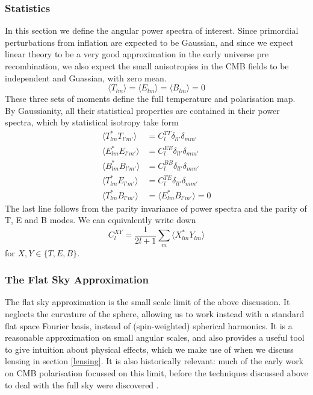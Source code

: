 \documentclass[a4paper,10pt]{article}
\begin{document}
\subsubsection{Statistics}

In this section we define the angular power spectra of interest. Since primordial perturbations from inflation are expected to be Gaussian, and since we expect linear theory to be a very good approximation in the early universe pre recombination, we also expect the small anisotropies in the CMB fields to be independent and Guassian, with zero mean. 
\begin{equation}
\langle T_{lm} \rangle = \langle E_{lm} \rangle = \langle B_{lm} \rangle = 0
\end{equation}
These three sets of moments define the full temperature and polarisation map. By Gaussianity, all their statistical properties are contained in their power spectra, which by statistical isotropy take form
\begin{equation}\begin{split}
\langle T_{lm}^*T_{l'm'} \rangle &= C^{TT}_l\delta_{ll'}\delta_{mm'}\\
\langle E_{lm}^*E_{l'm'} \rangle &= C^{EE}_l\delta_{ll'}\delta_{mm'}\\
\langle B_{lm}^*B_{l'm'} \rangle &= C^{BB}_l\delta_{ll'}\delta_{mm'}\\
\langle T_{lm}^*E_{l'm'} \rangle &= C^{TE}_l\delta_{ll'}\delta_{mm'}\\
\langle T_{lm}^*B_{l'm'} \rangle &= \langle E_{lm}^*B_{l'm'} \rangle = 0
\end{split}\end{equation}
The last line follows from the parity invariance of power spectra and the parity of T, E and B modes. We can equivalently write down
\begin{equation}
C_l^{XY} = \frac{1}{2l+1}\sum_m \langle X_{lm}^*Y_{lm}\rangle
\label{powerspectra}
\end{equation}
for $X,Y \in \{T, E,B\}$. 


\subsubsection{The Flat Sky Approximation}

The flat sky approximation is the small scale limit of the above discussion. It neglects the curvature of the sphere, allowing us to work instead with a standard flat space Fourier basis, instead of (spin-weighted) spherical harmonics. It is a reasonable approximation on small angular scales, and also provides a useful tool to give intuition about physical effects, which we make use of when we discuss lensing in section \ref{lensing}. It is also historically relevant: much of the early work on CMB polarisation focussed on this limit, before the techniques discussed above to deal with the full sky were discovered \cite{all-sky}.\\
\end{document}
